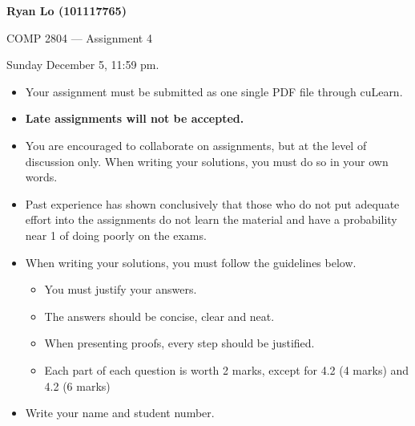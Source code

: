 \documentclass[12pt]{article}
\newcounter{ques}
\newenvironment{question}{\stepcounter{ques}{\noindent\bf Question \arabic{ques}:}}{\vspace{5mm}}
\begin{document}
\begin{center} \Large\bf
Ryan Lo (101117765)

COMP 2804 --- Assignment 4
\end{center}

 Sunday December 5, 11:59 pm.

\vspace{0.5em}

\begin{itemize}
\item Your assignment must be submitted as one single PDF file through
      cuLearn.
\item {\bf Late assignments will not be accepted.}
\item You are encouraged to collaborate on assignments, but at the level
      of discussion only. When writing your solutions, you must do so
      in your own words.
\item Past experience has shown conclusively that those who do not put
      adequate effort into the assignments do not learn the material and
      have a probability near 1 of doing poorly on the exams.
\item When writing your solutions, you must follow the guidelines below.
      \begin{itemize}
      \item You must justify your answers.
      \item The answers should be concise, clear and neat.
      \item When presenting proofs, every step should be justified.
      \item Each part of each question is worth 2 marks, except for 4.2 (4 marks) and 4.2 (6 marks)
      \end{itemize}
\end{itemize}

\begin{question}
\begin{itemize}
\item Write your name and student number.
\end{itemize}
\end{question}
\end{document}
